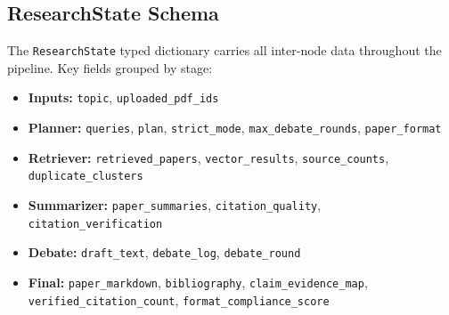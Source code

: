 \documentclass[12pt, a4paper]{article}
\begin{document}
\subsection{ResearchState Schema}

The \texttt{ResearchState} typed dictionary carries all inter-node data throughout the
pipeline. Key fields grouped by stage:

\begin{itemize}[leftmargin=*, itemsep=2pt]
    \item \textbf{Inputs:} \texttt{topic}, \texttt{uploaded\_pdf\_ids}
    \item \textbf{Planner:} \texttt{queries}, \texttt{plan}, \texttt{strict\_mode},
          \texttt{max\_debate\_rounds}, \texttt{paper\_format}
    \item \textbf{Retriever:} \texttt{retrieved\_papers}, \texttt{vector\_results},
          \texttt{source\_counts}, \texttt{duplicate\_clusters}
    \item \textbf{Summarizer:} \texttt{paper\_summaries}, \texttt{citation\_quality},
          \texttt{citation\_verification}
    \item \textbf{Debate:} \texttt{draft\_text}, \texttt{debate\_log},
          \texttt{debate\_round}
    \item \textbf{Final:} \texttt{paper\_markdown}, \texttt{bibliography},
          \texttt{claim\_evidence\_map}, \texttt{verified\_citation\_count},
          \texttt{format\_compliance\_score}
\end{itemize}
\end{document}
